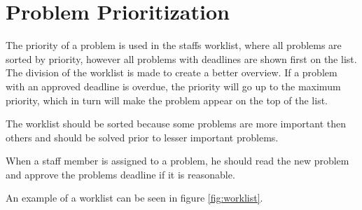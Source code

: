 \section{Problem Prioritization}
\label{sec:problem_priority}
The priority of a problem is used in the staffs worklist, where all problems are sorted by priority, however all problems with deadlines are shown first on the list.
The division of the worklist is made to create a better overview.
If a problem with an approved deadline is overdue, the priority will go up to the maximum priority, which in turn will make the problem appear on the top of the list.

\begin{comment}
The priority of a problem is based on two factors:


\begin{itemize}
	\item Whether or not a deadline is approved
	\item The priority of the tags attached to the problem
\end{itemize}
\end{comment}

The worklist should be sorted because some problems are more important then others and should be solved prior to lesser important problems. 

When a staff member is assigned to a problem, he should read the new problem and approve the problems deadline if it is reasonable. 


An example of a worklist can be seen in figure \ref{fig:worklist}.
